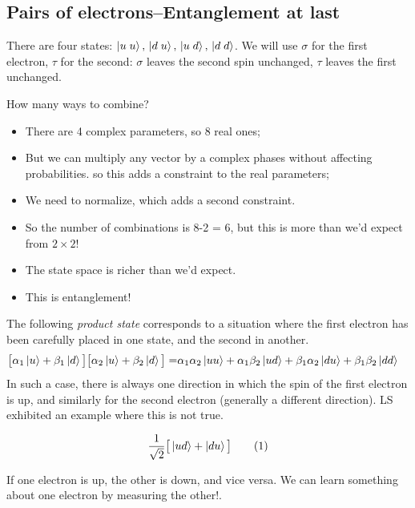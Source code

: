 \documentclass[]{article}
\newcommand\numberthis{\addtocounter{equation}{1}\tag{\theequation}}
\begin{document}
\subsection{Pairs of electrons--Entanglement at last}
There are four states: $\ket{u\;u}, \,\ket{d\;u}, \,\ket{u\;d}, \,\ket{d\;d}$.  We will use $\sigma$ for the first electron, $\tau$ for the second:  $\sigma$ leaves the second spin unchanged, $\tau$ leaves the first unchanged.

How many ways to combine? 
\begin{itemize}
	\item There are 4 complex parameters, so 8 real ones;
	\item But we can multiply any vector by a complex phases without affecting probabilities. so this adds a constraint to the real parameters;
	\item We need to normalize, which adds a second constraint.
	\item So the number of combinations is 8-2 = 6, but this is more than we'd expect from $2\times2$!
	\item The state space is richer than we'd expect. 
	\item This is entanglement!
\end{itemize}


The following \emph{product state} corresponds to a situation where the first electron has been carefully placed in one state, and the second in another.
\begin{align*}
	\big[\alpha_1\ket{u} + \beta_1\ket{d}\big]\big[\alpha_2\ket{u} + \beta_2\ket{d}\big] =& \alpha_1 \alpha_2 \ket{uu} + \alpha_1 \beta_2 \ket{ud} + \beta_1 \alpha_2 \ket{du} + \beta_1 \beta_2 \ket{dd}
\end{align*}
In such a case, there is always one direction in which the spin of the first electron is up, and similarly for the second electron (generally a different direction). LS exhibited an example where this is not true.

\begin{align*}
	\frac{1}{\sqrt{2}}\big[\ket{ud}+\ket{du}\big] \numberthis \label{eq:T1}
\end{align*}

If one electron is up, the other is down, and vice versa. We can learn something about one electron by measuring the other!.
\end{document}
